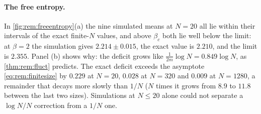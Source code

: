 \begin{refsection}
\paragraph{The free entropy.} In \cref{fig:rem:freeentropy}(a) the nine simulated means at $N=20$ all lie within their intervals of the exact finite-$N$ values, and above $\beta_c$ both lie well below the limit: at $\beta=2$ the simulation gives $2.214\pm0.015$, the exact value is $2.210$, and the limit is $2.355$. Panel (b) shows why: the deficit grows like $\frac1{2m}\log N=0.849\log N$, as \cref{thm:rem:fluct} predicts. The exact deficit exceeds the asymptote \eqref{eq:rem:finitesize} by $0.229$ at $N=20$, $0.028$ at $N=320$ and $0.009$ at $N=1280$, a remainder that decays more slowly than $1/N$ ($N$ times it grows from $8.9$ to $11.8$ between the last two sizes). Simulations at $N\le20$ alone could not separate a $\log N/N$ correction from a $1/N$ one.


\end{refsection}
